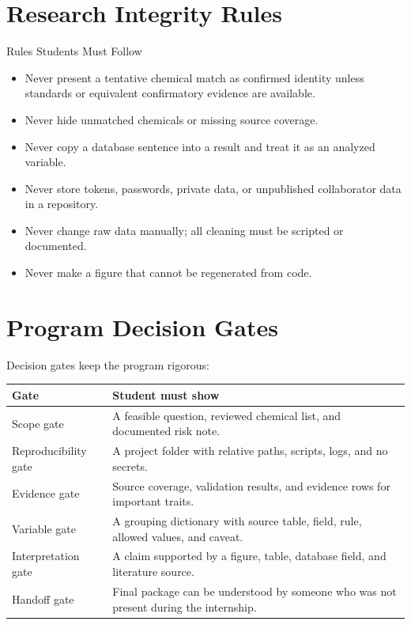 \section{Research Integrity Rules}
\begin{checklistbox}{Rules Students Must Follow}
\begin{itemize}
  \item Never present a tentative chemical match as confirmed identity unless standards or equivalent confirmatory evidence are available.
  \item Never hide unmatched chemicals or missing source coverage.
  \item Never copy a database sentence into a result and treat it as an analyzed variable.
  \item Never store tokens, passwords, private data, or unpublished collaborator data in a repository.
  \item Never change raw data manually; all cleaning must be scripted or documented.
  \item Never make a figure that cannot be regenerated from code.
\end{itemize}
\end{checklistbox}

\section{Program Decision Gates}
Decision gates keep the program rigorous:

\begin{tabularx}{\textwidth}{p{}Y}
\toprule
\textbf{Gate} & \textbf{Student must show}\\
\midrule
Scope gate & A feasible question, reviewed chemical list, and documented risk note.\\
Reproducibility gate & A project folder with relative paths, scripts, logs, and no secrets.\\
Evidence gate & Source coverage, validation results, and evidence rows for important traits.\\
Variable gate & A grouping dictionary with source table, field, rule, allowed values, and caveat.\\
Interpretation gate & A claim supported by a figure, table, database field, and literature source.\\
Handoff gate & Final package can be understood by someone who was not present during the internship.\\
\bottomrule
\end{tabularx}

